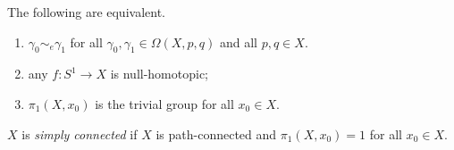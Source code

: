 \begin{corollary}
	The following are equivalent.
	\begin{enumerate}
		\item \( \gamma_0 \sim_e \gamma_1 \) for all \( \gamma_0, \gamma_1 \in \Omega(X,p,q) \) and all \( p,q \in X \).
		\item any \( f \colon S^1 \to X \) is null-homotopic;

		\item \( \pi_1(X,x_0) \) is the trivial group for all \( x_0 \in X \).
	\end{enumerate}
\end{corollary}
\begin{definition}
	\( X \) is \emph{simply connected} if \( X \) is path-connected and \( \pi_1(X,x_0) = 1 \) for all \( x_0 \in X \).
\end{definition}

